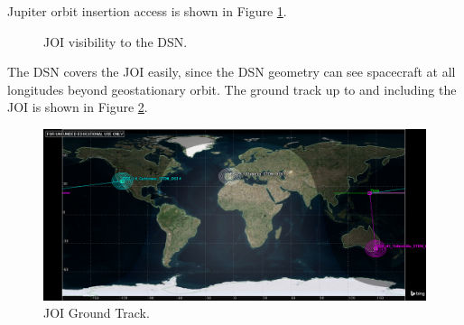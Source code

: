 \documentclass[]{aiaa-tc}%
\begin{document}
Jupiter orbit insertion access is shown in Figure \ref{fig:JOI_Access}.
	\begin{figure}[H]
		\centering
		\caption{JOI visibility to the DSN. }
		\label{fig:JOI_Access}
	\end{figure}	
The DSN covers the JOI easily, since the DSN geometry can see spacecraft at all longitudes beyond geostationary orbit. The ground track up to and including the JOI is shown in Figure \ref{fig:JOIGroundTrack}.
	\begin{figure}[H]
		\centering
			\includegraphics[width = 16cm]{../Figures/JOI_GroundTrack.png}
		\caption{JOI Ground Track. }
		\label{fig:JOIGroundTrack}
	\end{figure}	
\end{document}
